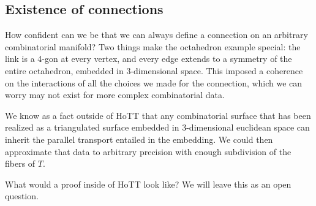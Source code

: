 \begin{comment}
The donut-shaped torus suggests a different connection, one determined by the embedding in 3-space that we have represented. But the easiest way to think about that bundle and its connection and curvature is to wait until we have a proof of the Poincaré-Hopf theorem, so that we can instead compute with a vector field.
\end{comment}

\subsection{Existence of connections}

How confident can we be that we can always define a connection on an arbitrary combinatorial manifold? Two things make the octahedron example special: the link is a 4-gon at every vertex, and every edge extends to a symmetry of the entire octahedron, embedded in 3-dimensional space. This imposed a coherence on the interactions of all the choices we made for the connection, which we can worry may not exist for more complex combinatorial data.

We know as a fact outside of HoTT that any combinatorial surface that has been realized as a triangulated surface embedded in 3-dimensional euclidean space can inherit the parallel transport entailed in the embedding. We could then approximate that data to arbitrary precision with enough subdivision of the fibers of \( T \).

What would a proof inside of HoTT look like? We will leave this as an open question.

